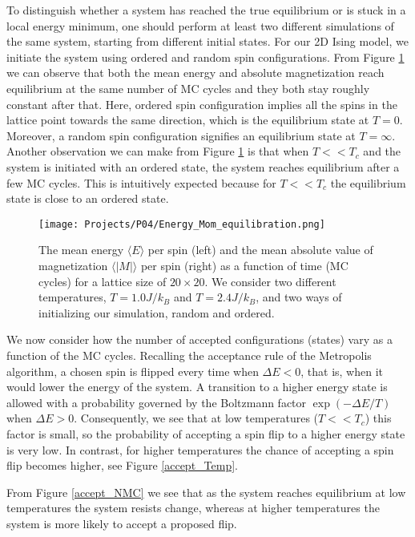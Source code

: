\documentclass[a4paper]{article}
\begin{document}
To distinguish whether a system has reached the true equilibrium or is stuck in a local energy minimum, one should perform at least two different simulations of the same system, starting from different initial states. For our 2D Ising model, we initiate the system using ordered and random spin configurations. From Figure \ref{Energy_Mom_equilibration} we can observe that both the mean energy and absolute magnetization reach equilibrium at the same number of MC cycles and they both stay roughly constant after that. Here, ordered spin configuration implies all the spins in the lattice point towards the same direction, which is the equilibrium state at $T=0$. Moreover, a random spin configuration signifies an equilibrium state at $T=\infty$. Another observation we can make from Figure \ref{Energy_Mom_equilibration} is that when $T<<T_c$ and the system is initiated with an ordered state, the system reaches equilibrium after a few MC cycles. This is intuitively expected because for $T<<T_c$ the equilibrium state is close to an ordered state.

\begin{figure}[H]
  \centering
  \texttt{[image: Projects/P04/Energy\_Mom\_equilibration.png]}
  \caption{The mean energy $\langle E \rangle$ per spin (left) and the mean absolute value of magnetization $\langle |M| \rangle$ per spin (right) as a function of time (MC cycles) for a lattice size of $20\times20$. We consider two different temperatures, $T=1.0 J/k_B$ and $T=2.4 J/k_B$, and two ways of initializing our simulation, random and ordered.}
   \label{Energy_Mom_equilibration}
\end{figure}

We now consider how the number of accepted configurations (states) vary as a function of the MC cycles. Recalling the acceptance rule of the Metropolis algorithm, a chosen spin is flipped every time when $\Delta E < 0$, that is, when it would lower the energy of the system. A transition to a higher energy state is allowed with a probability governed by the Boltzmann factor $\exp\left(-\Delta E/T\right)$ when $\Delta E > 0$. Consequently, we see that at low temperatures ($T<<T_c$) this factor is small, so the probability of accepting a spin flip to a higher energy state is very low. In contrast, for higher temperatures the chance of accepting a spin flip becomes higher, see Figure \ref{accept_Temp}.

From Figure \ref{accept_NMC} we see that as the system reaches equilibrium at low temperatures the system resists change, whereas at higher temperatures the system is more likely to accept a proposed flip.  
\end{document}
